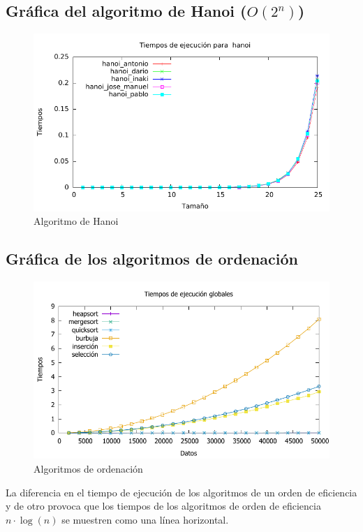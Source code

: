 \documentclass[a4paper, 11pt]{article}
\begin{document}
\subsection{Gráfica del algoritmo de Hanoi ($O(2^n)$)}
\begin{figure}[h] \includegraphics[width=13cm]{hanoi_todos_g} \centering
	\caption{Algoritmo de Hanoi} \end{figure}


\subsection{Gráfica de los algoritmos de ordenación}
\begin{figure}[h] \includegraphics[width=14cm]{comparativa_global_g} \centering
	\caption{Algoritmos de ordenación} \end{figure}

La diferencia en el tiempo de ejecución de los algoritmos de un orden de eficiencia y de otro provoca que los tiempos de los algoritmos de orden de eficiencia $n \cdot \log (n)$ se muestren como una línea horizontal.
\end{document}
